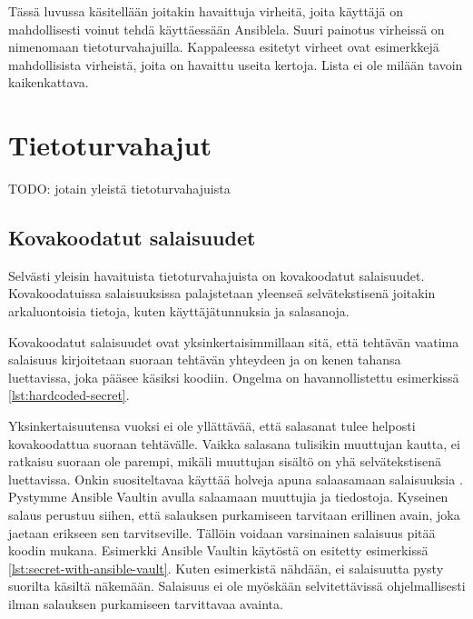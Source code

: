 Tässä luvussa käsitellään joitakin havaittuja virheitä, joita käyttäjä on mahdollisesti
voinut tehdä käyttäessään Ansiblela. Suuri painotus virheissä on nimenomaan
tietoturvahajuilla. Kappaleessa esitetyt virheet ovat esimerkkejä mahdollisista
virheistä, joita on havaittu useita kertoja. Lista ei ole milään tavoin kaikenkattava.

\section{Tietoturvahajut}

TODO: jotain yleistä tietoturvahajuista

\subsection{Kovakoodatut salaisuudet}

Selvästi yleisin havaituista tietoturvahajuista on kovakoodatut salaisuudet. Kovakoodatuissa
salaisuuksissa palajstetaan yleenseä selvätekstisenä joitakin arkaluontoisia tietoja, kuten
käyttäjätunnuksia ja salasanoja. \parencite{RahmanAkond2019TSSS}

Kovakoodatut salaisuudet ovat yksinkertaisimmillaan sitä, että tehtävän vaatima salaisuus
kirjoitetaan suoraan tehtävän yhteydeen ja on kenen tahansa luettavissa, joka pääsee käsiksi
koodiin. Ongelma on havannollistettu esimerkissä  \ref{lst:hardcoded-secret}.



Yksinkertaisuutensa vuoksi ei ole yllättävää, että salasanat tulee helposti kovakoodattua
suoraan tehtävälle. Vaikka salasana tulisikin muuttujan kautta, ei ratkaisu suoraan ole
parempi, mikäli muuttujan sisältö on yhä selvätekstisenä luettavissa. Onkin suositeltavaa
käyttää holveja apuna salaasamaan salaisuuksia \parencite{RahmanAkond2019TSSS}. Pystymme
Ansible Vaultin avulla salaamaan muuttujia ja tiedostoja. Kyseinen salaus perustuu siihen,
että salauksen purkamiseen tarvitaan erillinen avain, joka jaetaan erikseen sen tarvitseville.
Tällöin voidaan varsinainen salaisuus pitää koodin mukana. Esimerkki Ansible Vaultin käytöstä
on esitetty esimerkissä \ref{lst:secret-with-ansible-vault}. Kuten esimerkistä nähdään,
ei salaisuutta pysty suorilta käsiltä näkemään. Salaisuus ei ole myöskään selvitettävissä
ohjelmallisesti ilman salauksen purkamiseen tarvittavaa avainta.

